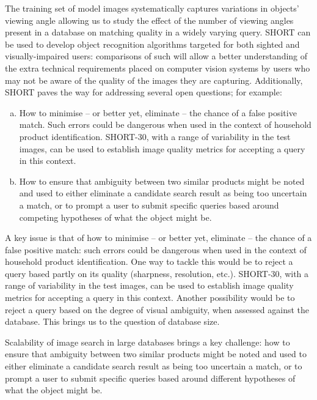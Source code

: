 The training set of model images systematically captures variations in objects' viewing angle allowing us to study the effect of the number of viewing angles present in a database on matching quality in a widely varying query. SHORT can be used to develop object recognition algorithms targeted for both sighted and visually-impaired users: comparisons of such will allow a better understanding of the extra technical requirements placed on computer vision systems by users who may not be aware of the quality of the images they are capturing. Additionally, SHORT paves the way for addressing several open questions; for example:

\begin{enumerate}[a)]
\item How to minimise -- or better yet, eliminate -- the chance of a false positive match. Such errors could be dangerous when used in the context of household product identification. SHORT-30, with a range of variability in the test images, can be used to establish image quality metrics for accepting a query in this context.

\item How to ensure that ambiguity between two similar products might be noted and used to either eliminate a candidate search result as being too uncertain a match, or to prompt a user to submit specific queries based around competing hypotheses of what the object might be.
\end{enumerate}



A key issue is that of how to minimise -- or better yet, eliminate -- the chance of a false positive match: such errors could be dangerous when used in the context of household product identification. One way to tackle this would be to reject a query based partly on its quality (sharpness, resolution, etc.). SHORT-30, with a range of variability in the test images, can be used to establish image quality metrics for accepting a query in this context. Another possibility would be to reject a query based on the degree of visual ambiguity, when assessed against the database. This brings us to the question of database size.

Scalability of image search in large databases brings a key challenge: how to ensure that ambiguity between two similar products might be noted and used to either eliminate a candidate search result as being too uncertain a match, or to prompt a user to submit specific queries based around different hypotheses of what the object might be. 

